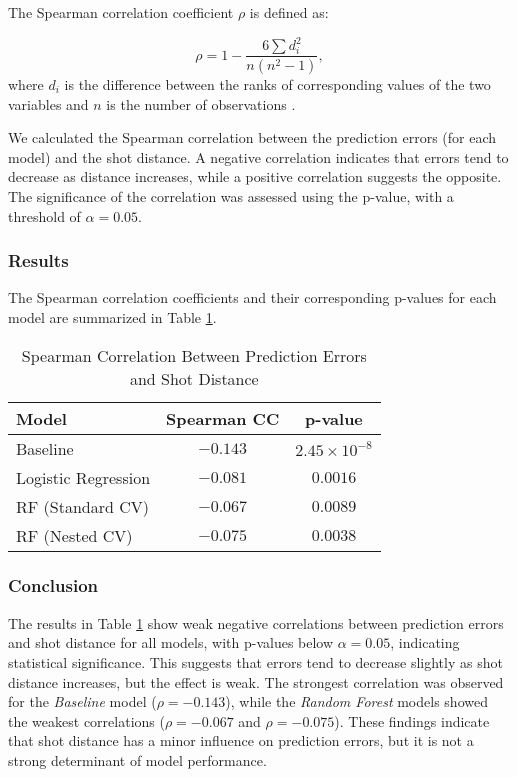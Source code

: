 \documentclass[fleqn,moreauthors,10pt]{ds_report}
\begin{document}
The Spearman correlation coefficient \( \rho \) is defined as:

\[
\rho = 1 - \frac{6 \sum d_i^2}{n(n^2 - 1)},
\]
where \( d_i \) is the difference between the ranks of corresponding values of the two variables and \( n \) is the number of observations \cite{Corder2014Nonparametric}.

We calculated the Spearman correlation between the prediction errors (for each model) and the shot distance. A negative correlation indicates that errors tend to decrease as distance increases, while a positive correlation suggests the opposite. The significance of the correlation was assessed using the p-value, with a threshold of \( \alpha = 0.05 \).

\subsubsection*{Results}

The Spearman correlation coefficients and their corresponding p-values for each model are summarized in Table \ref{tab:spearman_results}.

\begin{table}[h]
\centering
\caption{Spearman Correlation Between Prediction Errors and Shot Distance}
\begin{tabular}{|l|c|c|}
\hline
\textbf{Model} & \textbf{Spearman CC} & \textbf{p-value} \\ \hline
Baseline & \(-0.143\) & \(2.45 \times 10^{-8}\) \\ \hline
Logistic Regression & \(-0.081\) & \(0.0016\) \\ \hline
RF (Standard CV) & \(-0.067\) & \(0.0089\) \\ \hline
RF (Nested CV) & \(-0.075\) & \(0.0038\) \\ \hline
\end{tabular}
\label{tab:spearman_results}
\end{table}

\subsubsection*{Conclusion}
The results in Table \ref{tab:spearman_results} show weak negative correlations between prediction errors and shot distance for all models, with p-values below \( \alpha = 0.05 \), indicating statistical significance. This suggests that errors tend to decrease slightly as shot distance increases, but the effect is weak. The strongest correlation was observed for the \textit{Baseline} model (\( \rho = -0.143 \)), while the \textit{Random Forest} models showed the weakest correlations (\( \rho = -0.067 \) and \( \rho = -0.075 \)). These findings indicate that shot distance has a minor influence on prediction errors, but it is not a strong determinant of model performance.
\end{document}
